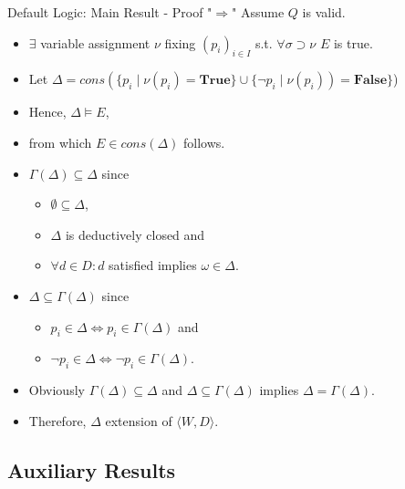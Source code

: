 \documentclass[usenames,dvipsnames, 8pt]{beamer}
\let\lneg\neg
\begin{document}
\begin{frame}{Default Logic: Main Result - Proof "$\Longrightarrow$"}
Assume $Q$ is valid.
\begin{itemize}[label = {$\bullet$}]
\item $\exists$ variable assignment $\nu$ fixing $(p_i)_{i\in I}$ s.t. $\forall \sigma \supset \nu$ $E$ is true.
\item Let $\Delta = cons(\{p_i \mid \nu(p_i) = \mathbf{True}\}\cup \{\neg p_i \mid \nu(p_i)) = \mathbf{False}\}$)
\item Hence, $\Delta \models E$, 
\item from which $E \in cons(\Delta)$ follows.
\item $\Gamma(\Delta)\subseteq\Delta$ since
\begin{itemize}[label={$-$}]
\item $\emptyset \subseteq \Delta$,
\item $\Delta$ is deductively closed and 
\item $\forall d \in D: d$ satisfied implies $\omega \in \Delta$.
\end{itemize}
\item $\Delta \subseteq \Gamma(\Delta)$ since
\begin{itemize}[label={$-$}]
\item $p_i \in \Delta \iff p_i \in \Gamma(\Delta)$ and
\item $\lneg p_i \in \Delta \iff \lneg p_i \in \Gamma(\Delta)$.
\end{itemize}
\item Obviously $\Gamma(\Delta)\subseteq\Delta$ and $\Delta \subseteq \Gamma(\Delta)$ implies $\Delta = \Gamma(\Delta)$.
\item Therefore, $\Delta$ extension of $\langle W, D \rangle$.
\end{itemize}
\end{frame}



\subsection{Auxiliary Results}
\end{document}
